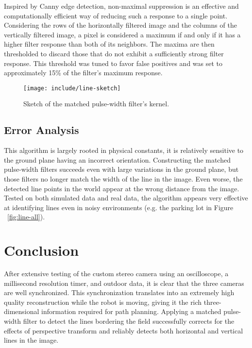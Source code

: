 \documentclass[twocolumn,11pt]{article}
\begin{document}
Inspired by Canny edge detection, non-maximal suppression is an effective and
computationally efficient way of reducing such a response to a single point.
Considering the rows of the horizontally filtered image and the columns of the
vertically filtered image, a pixel is considered a maximum if and only if it
has a higher filter response than both of its neighbors. The maxima are then
thresholded to discard those that do not exhibit a sufficiently strong filter
response. This threshold was tuned to favor false positives and was set to
approximately 15\% of the filter's maximum response.

\begin{figure}
	\centering
	\texttt{[image: include/line-sketch]}
	\caption{Sketch of the matched pulse-width filter's kernel.}
	\label{fig:line-sketch}
\end{figure}

\subsection{Error Analysis}
\label{sec:line-error}
This algorithm is largely rooted in physical constants, it is relatively
sensitive to the ground plane having an incorrect orientation. Constructing the
matched pulse-width filters succeeds even with large variations in the ground
plane, but those filters no longer match the width of the line in the image.
Even worse, the detected line points in the world appear at the wrong distance
from the image. Tested on both simulated data and real data, the algorithm
appears very effective at identifying lines even in noisy environments (e.g.
the parking lot in Figure ~\ref{fig:line-all}).

\section{Conclusion}
\label{sec:conclusion}
After extensive testing of the custom stereo camera using an oscilloscope, a
millisecond resolution timer, and outdoor data, it is clear that the three
cameras are well synchronized. This synchronization translates into an
extremely high quality reconstruction while the robot is moving, giving it the
rich three-dimensional information required for path planning. Applying a
matched pulse-width filter to detect the lines bordering the field successfully
corrects for the effects of perspective transform and reliably detects both
horizontal and vertical lines in the image.
\end{document}
